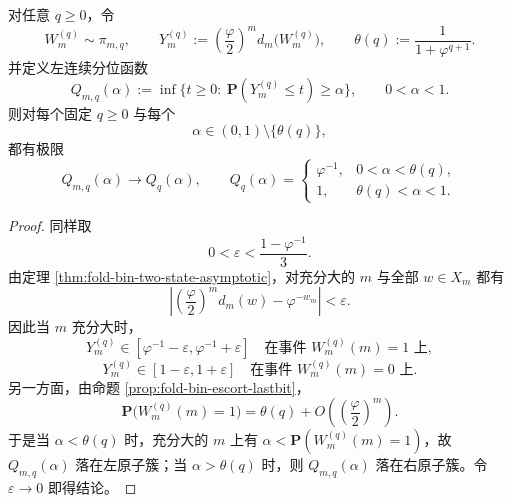 \begin{theorem}\label{thm:xi-time-part70ab-escort-quantile-phase-diagram}
对任意 \(q\ge 0\)，令
\[
W_m^{(q)}\sim \pi_{m,q},
\qquad
Y_m^{(q)}:=\left(\frac{\varphi}{2}\right)^m d_m\bigl(W_m^{(q)}\bigr),
\qquad
\theta(q):=\frac{1}{1+\varphi^{q+1}}.
\]
并定义左连续分位函数
\[
Q_{m,q}(\alpha):=\inf\{t\ge 0:\ \mathbf P(Y_m^{(q)}\le t)\ge \alpha\},
\qquad
0<\alpha<1.
\]
则对每个固定 \(q\ge 0\) 与每个
\[
\alpha\in(0,1)\setminus\{\theta(q)\},
\]
都有极限
\[
Q_{m,q}(\alpha)\longrightarrow Q_q(\alpha),
\qquad
Q_q(\alpha)=
\begin{cases}
\varphi^{-1}, & 0<\alpha<\theta(q),\\[2mm]
1, & \theta(q)<\alpha<1.
\end{cases}
\]
\end{theorem}
\begin{proof}
同样取
\[
0<\varepsilon<\frac{1-\varphi^{-1}}{3}.
\]
由定理 \ref{thm:fold-bin-two-state-asymptotic}，对充分大的 \(m\) 与全部 \(w\in X_m\) 都有
\[
\left|\left(\frac{\varphi}{2}\right)^m d_m(w)-\varphi^{-w_m}\right|<\varepsilon.
\]
因此当 \(m\) 充分大时，
\[
Y_m^{(q)}\in[\varphi^{-1}-\varepsilon,\varphi^{-1}+\varepsilon]
\quad\text{在事件 }W_m^{(q)}(m)=1\text{ 上},
\]
\[
Y_m^{(q)}\in[1-\varepsilon,1+\varepsilon]
\quad\text{在事件 }W_m^{(q)}(m)=0\text{ 上}.
\]
另一方面，由命题 \ref{prop:fold-bin-escort-lastbit}，
\[
\mathbf P\bigl(W_m^{(q)}(m)=1\bigr)=\theta(q)+O\!\left(\left(\frac{\varphi}{2}\right)^m\right).
\]
于是当 \(\alpha<\theta(q)\) 时，充分大的 \(m\) 上有 \(\alpha<\mathbf P(W_m^{(q)}(m)=1)\)，故 \(Q_{m,q}(\alpha)\) 落在左原子簇；当 \(\alpha>\theta(q)\) 时，则 \(Q_{m,q}(\alpha)\) 落在右原子簇。令 \(\varepsilon\to 0\) 即得结论。
\end{proof}

